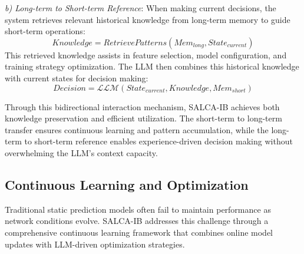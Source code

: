 \documentclass[conference]{IEEEtran}
\begin{document}
\textit{b) Long-term to Short-term Reference}: When making current decisions, the system retrieves relevant historical knowledge from long-term memory to guide short-term operations:
\begin{equation}
    Knowledge = RetrievePatterns(Mem_{long}, State_{current})
\end{equation}
This retrieved knowledge assists in feature selection, model configuration, and training strategy optimization. The LLM then combines this historical knowledge with current states for decision making:
\begin{equation}
    Decision = \mathcal{LLM}(State_{current}, Knowledge, Mem_{short})
\end{equation}

Through this bidirectional interaction mechanism, SALCA-IB achieves both knowledge preservation and efficient utilization. The short-term to long-term transfer ensures continuous learning and pattern accumulation, while the long-term to short-term reference enables experience-driven decision making without overwhelming the LLM's context capacity.

\subsection{Continuous Learning and Optimization}
Traditional static prediction models often fail to maintain performance as network conditions evolve. SALCA-IB addresses this challenge through a comprehensive continuous learning framework that combines online model updates with LLM-driven optimization strategies.
\end{document}
